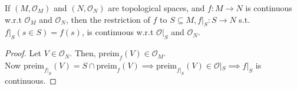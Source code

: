\begin{theorem}
If $(M, \mathcal{O}_{M})$ and $(N, \mathcal{O}_{N})$ are topological spaces, and $f: M \to N$ is continuous w.r.t $\mathcal{O}_{M}$ and $\mathcal{O}_{N}$, then the restriction of $f$ to $S \subseteq M, f|_S: S \to N$ s.t. $f|_S(s \in S) = f(s)$, is continuous w.r.t $\mathcal{O}|_S$ and $\mathcal{O}_{N}$.
\end{theorem}

\begin{proof}
Let $V \in \mathcal{O}_N$. Then, $\text{preim}_{f}(V) \in \mathcal{O}_M$. \\
Now $\text{preim}_{f|_S}(V) = S \cap \text{preim}_{f}(V) \implies \text{preim}_{f|_S}(V) \in \mathcal{O}|_S \implies f|_S$ is continuous. 
\end{proof}
